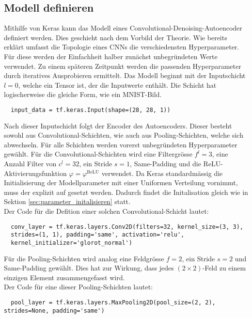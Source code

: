\subsection{Modell definieren}
Mithilfe von Keras kann das Modell eines Convolutional-Denoising-Autoencoder
definiert werden. Dies geschieht nach dem Vorbild der Theorie.
Wie bereits erklärt umfasst die Topologie eines CNNs die verschiedensten Hyperparameter.
Für diese werden der Einfachheit halber zunächst unbegründeten Werte verwendet.
Zu einem späteren Zeitpunkt werden die passenden Hyperparameter durch iteratives Ausprobieren ermittelt.
\para{}
Das Modell beginnt mit der Inputschicht $l=0$, welche ein Tensor ist, der
die Inputwerte enthält. Die Schicht hat logischerweise die gleiche Form, wie ein MNIST-Bild.
\begin{verbatim}
  input_data = tf.keras.Input(shape=(28, 28, 1))
\end{verbatim}
\para{}
Nach dieser Inputschicht folgt der Encoder des Autoencoders. Dieser besteht
sowohl aus Convolutional-Schichten, wie auch aus Pooling-Schichten, welche sich abwechseln.
Für alle Schichten werden vorerst unbegründeten Hyperparameter gewählt.
Für die Convolutional-Schichten wird
eine Filtergrösse $f^l = 3$, eine Anzahl Filter von $c^l = 32$,
ein Stride $s=1$, Same-Padding und die ReLU-Aktivierungsfunktion $\varphi =
\varphi^{\text{ReLU}}$ verwendet.
Da Keras standardmässig die Initialisierung der Modellparameter mit einer
Uniformen Verteilung vornimmt, muss der  explizit auf
 gesetzt werden. Dadurch findet die Initalisation gleich
wie in Sektion \ref{sec:parameter_initalisieren} statt. \\
Der Code für die Defition einer solchen Convolutional-Schicht lautet:
\begin{verbatim}
  conv_layer = tf.keras.layers.Conv2D(filters=32, kernel_size=(3, 3),
  strides=(1, 1), padding='same', activation='relu',
  kernel_initializer='glorot_normal')
\end{verbatim}
Für die Pooling-Schichten wird analog eine Feldgrösse $f = 2$, ein
Stride $s = 2$ und Same-Padding gewählt. Dies hat zur Wirkung, dass jedes $(2
\times 2)$-Feld zu einem einzigen Element zusammengefasst wird. \\
Der Code für eine dieser Pooling-Schichten lautet:
\begin{verbatim}
  pool_layer = tf.keras.layers.MaxPooling2D(pool_size=(2, 2), strides=None, padding='same')
\end{verbatim}
